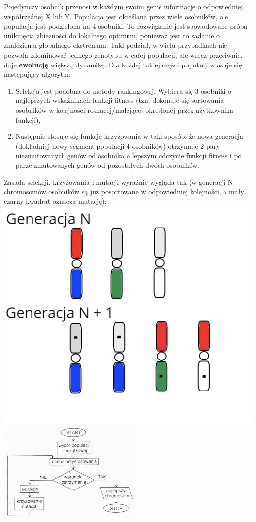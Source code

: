 \documentclass[a4paper, 12pt]{article}
\begin{document}
Pojedynczy osobnik przenosi w każdym swoim genie informacje o odpowiedniej współrzędnej X lub Y. Populacja jest określana przez wiele osobników, ale populacja jest podzielona na 4 osobniki. To rozwiązanie jest spowodowane próbą uniknięcia zbieżności do lokalnego optimum, ponieważ jest to zadanie o znalezieniu globalnego ekstremum. Taki podział, w wielu przypadkach nie pozwala zdominować jednego genotypu w całej populacji, ale wręcz przeciwnie, daje \textbf{ewolucję} większą dynamikę. Dla każdej takiej części populacji stosuje się następujący algorytm:
\begin{enumerate}
    \item Selekcja jest podobna do metody rankingowej. Wybiera się 3 osobniki o najlepszych wskaźnikach funkcji fitness (tzn. dokonuje się sortowania osobników w kolejności rosnącej/malejącej określonej przez użytkownika funkcji),
    \item Następnie stosuje się funkcję krzyżowania w taki sposób, że nowa generacja (dokładniej nowy segment populacji 4 osobników) otrzymuje 2 pary niezmutowanych genów od osobnika o lepszym odczycie funkcji fitness i po parze zmutowanych genów od pozostałych dwóch osobników. 
\end{enumerate}

Zasada selekcji, krzyżowania i mutacji wyraźnie wygląda tak (w generacji N chromosomów osobników są już posortowane w odpowiedniej kolejności, a mały czarny kwadrat oznacza mutację):\\
\includegraphics[scale=3]{generacji.png}\\
\includegraphics[scale=0.92]{schemat.jpg}
\end{document}
